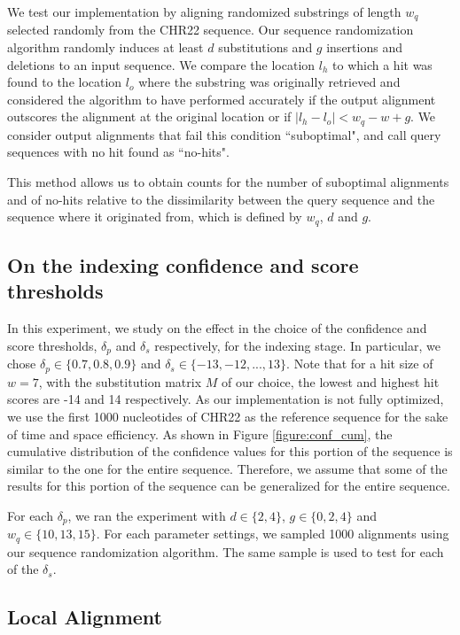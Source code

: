 \documentclass{article}
\begin{document}
We test our implementation by aligning randomized substrings of length $w_q$ selected randomly from the CHR22 sequence. Our sequence randomization algorithm randomly induces at least $d$ substitutions and $g$ insertions and deletions to an input sequence. We compare the location $l_h$ to which a hit was found to the location $l_o$ where the substring was originally retrieved and considered the algorithm to have performed accurately if the output alignment outscores the alignment at the original location or if $|l_h - l_o| < w_q - w + g$. We consider output alignments that fail this condition ``suboptimal", and call query sequences with no hit found as ``no-hits".

This method allows us to obtain counts for the number of suboptimal alignments and of no-hits relative to the dissimilarity between the query sequence and the sequence where it originated from, which is defined by $w_q$, $d$ and $g$. 

\subsection{On the indexing confidence and score thresholds}

In this experiment, we study on the effect in the choice of the confidence and score thresholds, $\delta_p$ and $\delta_s$ respectively, for the indexing stage. In particular, we chose $\delta_p \in \{0.7, 0.8, 0.9\} $ and $\delta_s \in \{-13, -12, ... , 13\}$. Note that for a hit size of $w = 7$, with the substitution matrix $M$ of our choice, the lowest and highest hit scores are -14 and 14 respectively. As our implementation is not fully optimized, we use the first 1000 nucleotides of CHR22 as the reference sequence for the sake of time and space efficiency. As shown in Figure \ref{figure:conf_cum}, the cumulative distribution of the confidence values for this portion of the sequence is similar to the one for the entire sequence. Therefore, we assume that some of the results for this portion of the sequence can be generalized for the entire sequence.

For each $\delta_p$, we ran the experiment with $d \in \{2, 4\}$, $g \in \{0, 2, 4\}$ and $w_q \in \{10, 13, 15\}$. For each parameter settings, we sampled 1000 alignments using our sequence randomization algorithm. The same sample is used to test for each of the $\delta_s$.

\subsection{Local Alignment}
\end{document}
